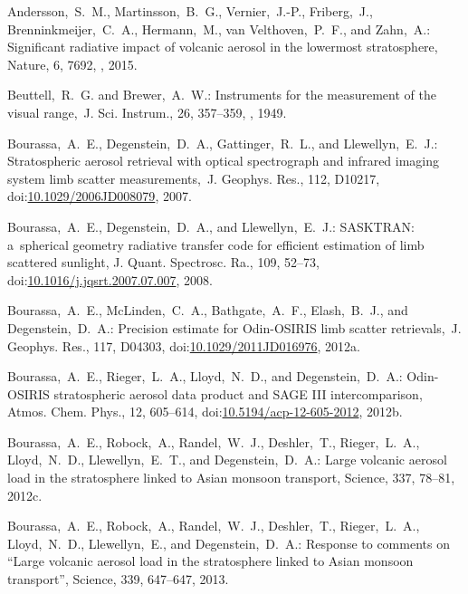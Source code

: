 \documentclass[amtd, online, hvmath]{copernicus}
\begin{document}
\begin{thebibliography}{99}

Andersson,~S.~M., Martinsson,~B.~G., Vernier,~J.-P., Friberg,~J.,
Brenninkmeijer,~C.~A., Hermann,~M., van Velthoven,~P.~F., and Zahn,~A.:
Significant radiative impact of volcanic aerosol in the lowermost
stratosphere, Nature, 6, 7692, , 2015.


Beuttell,~R.~G. and Brewer,~A.~W.: Instruments for the measurement of the
visual range,~J. Sci. Instrum., 26, 357--359,
, 1949.


Bourassa,~A.~E., Degenstein,~D.~A., Gattinger,~R.~L., and Llewellyn,~E.~J.:
Stratospheric aerosol retrieval with optical spectrograph and infrared
imaging system limb scatter measurements,~J. Geophys. Res., 112, D10217,
doi:\href{http://dx.doi.org/10.1029/2006JD008079}{10.1029/2006JD008079},
2007.


Bourassa,~A.~E., Degenstein,~D.~A., and Llewellyn,~E.~J.: SASKTRAN:
a~spherical geometry radiative transfer code for efficient estimation of limb
scattered sunlight, J. Quant. Spectrosc. Ra., 109, 52--73,
doi:\href{http://dx.doi.org/10.1016/j.jqsrt.2007.07.007}{10.1016/j.jqsrt.2007.07.007},
2008.


Bourassa,~A.~E., McLinden,~C.~A., Bathgate,~A.~F., Elash,~B.~J., and
Degenstein,~D.~A.: Precision estimate for Odin-OSIRIS limb scatter
retrievals,~J. Geophys. Res., 117, D04303,
doi:\href{http://dx.doi.org/10.1029/2011JD016976}{10.1029/2011JD016976},
2012a.


Bourassa,~A.~E., Rieger,~L.~A., Lloyd,~N.~D., and Degenstein,~D.~A.:
Odin-OSIRIS stratospheric aerosol data product and SAGE III intercomparison,
Atmos. Chem. Phys., 12, 605--614,
doi:\href{http://dx.doi.org/10.5194/acp-12-605-2012}{10.5194/acp-12-605-2012},
2012b.


Bourassa,~A.~E., Robock,~A., Randel,~W.~J., Deshler,~T.,
  Rieger,~L.~A., Lloyd,~N.~D., Llewellyn,~E.~T., and
  Degenstein,~D.~A.: Large volcanic aerosol load in the stratosphere
  linked to Asian monsoon transport, Science, 337, 78--81,
  2012c.


Bourassa,~A.~E., Robock,~A., Randel,~W.~J., Deshler,~T., Rieger,~L.~A.,
Lloyd,~N.~D., Llewellyn,~E., and Degenstein,~D.~A.: Response to comments on
``Large volcanic aerosol load in the stratosphere linked to Asian monsoon
transport'', Science, 339, 647--647, 2013.



\end{thebibliography}
\end{document}
